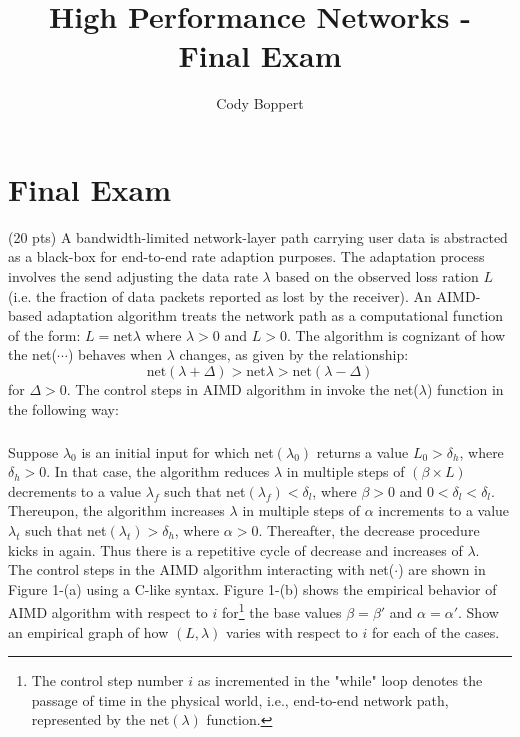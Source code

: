 \documentclass{jhwhw}
\begin{document}
\title{High Performance Networks - Final Exam}
\author{Cody Boppert}

\maketitle

\section*{Final Exam}
\nopagebreak[4]

\problem{}
(20 pts) A bandwidth-limited network-layer path carrying user data is abstracted as a black-box for end-to-end rate adaption purposes. The adaptation process involves the send adjusting the data rate $\lambda$ based on  the observed loss ration $L$ (i.e. the fraction of data packets reported as lost by the receiver). An AIMD-based adaptation algorithm treats the network path as a computational function of the form: $L = \mbox{net}{\lambda}$ where $\lambda > 0$ and $L > 0$. The algorithm is cognizant of how the net($\cdots$) behaves when $\lambda$ changes, as given by the relationship:
\begin{equation*}
\mbox{net}(\lambda + \Delta) > \mbox{net}{\lambda} > \mbox{net}(\lambda - \Delta)
\end{equation*}
for $\Delta > 0$. The control steps in AIMD algorithm in invoke the net($\lambda$) function in the following way:
\subparagraph{}
Suppose $\lambda_{0}$ is an initial input for which net$(\lambda_{0})$ returns a value $L_{0} > \delta_{h}$, where $\delta_{h} > 0$. In that case, the algorithm reduces $\lambda$ in multiple steps of $(\beta \times L)$ decrements to a value $\lambda_{f}$ such that net$(\lambda_{f}) < \delta_{l}$, where $\beta > 0$ and $0 < \delta_{l} < \delta_{l}$. Thereupon, the algorithm increases $\lambda$ in  multiple steps of $\alpha$ increments to a value $\lambda_{t}$ such that net$(\lambda_{t}) > \delta_{h}$, where $\alpha > 0$. Thereafter, the decrease procedure kicks in again. Thus there is a repetitive cycle of decrease and increases of $\lambda$.\\

\noindent The control steps in the AIMD algorithm interacting with net($\cdot$) are shown in Figure 1-(a) using a C-like syntax. Figure 1-(b) shows the empirical behavior of AIMD algorithm with respect to $i$ for\footnote{The control step number $i$ as incremented in the "while" loop denotes the passage of time in the physical world, i.e., end-to-end network path, represented by the net$(\lambda)$ function.} the base values $\beta = \beta'$ and $\alpha = \alpha'$. Show an empirical graph of how $(L, \lambda)$ varies with respect to $i$ for each of the cases.
\end{document}
